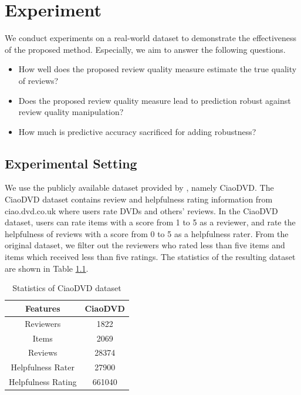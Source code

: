 \documentclass[master,english,final]{kaist-ucs}
\begin{document}

\chapter{Experiment}
We conduct experiments on a real-world dataset to demonstrate the effectiveness of the proposed method.
Especially, we aim to answer the following questions.
\begin{itemize}
\item How well does the proposed review quality measure estimate the true quality of reviews?
\item Does the proposed review quality measure lead to prediction robust against review quality manipulation?
\item How much is predictive accuracy sacrificed for adding robustness?
\end{itemize}

\section{Experimental Setting}
We use the publicly available dataset provided by \cite{ETAF}, namely CiaoDVD.
The CiaoDVD dataset contains review and helpfulness rating information from ciao.dvd.co.uk where users rate DVDs and others’ reviews.
In the CiaoDVD dataset, users can rate items with a score from 1 to 5 as a reviewer, and rate the helpfulness of reviews with a score from 0 to 5 as a helpfulness rater.
From the original dataset, we filter out the reviewers who rated less than five items and items which received less than five ratings.
The statistics of the resulting dataset are shown in Table \ref{tableCiaoDVD}.
\begin{table}[h]
\caption{Statistics of CiaoDVD dataset}
\label{tableCiaoDVD}
\begin{center}
\begin{tabular} {|c|c|}
\hline
\textbf{Features} & \textbf{CiaoDVD} \\ \hline
Reviewers & 1822 \\ \hline
Items & 2069 \\ \hline
Reviews & 28374 \\ \hline
Helpfulness Rater & 27900 \\ \hline
Helpfulness Rating & 661040 \\ \hline
\end{tabular}
\end{center}
\end{table}
\end{document}
